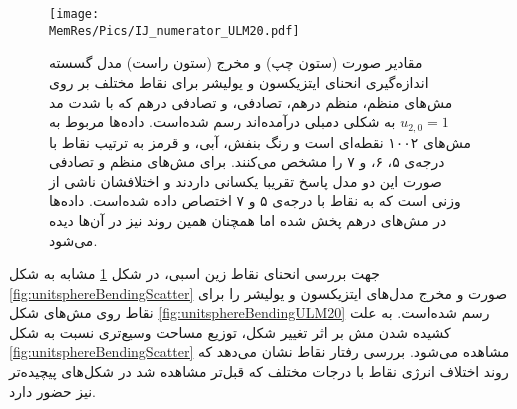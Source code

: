 \begin{figure}[htbp]
\begin{center}
\texttt{[image: \\MemRes/Pics/IJ\_numerator\_ULM20.pdf]}
\caption{
مقادیر صورت (ستون چپ) و مخرج (ستون راست) مدل گسسته اندازه‌گیری انحنای ایتزیکسون و یولیشر برای نقاط مختلف بر روی مش‌های منظم، منظم درهم، تصادفی، و تصادفی درهم که با شدت مد 
$u_{2,0}=1$
به شکلی دمبلی درآمده‌اند رسم شده‌است. داده‌ها مربوط به مش‌های ۱۰۰۲ نقطه‌ای است و  رنگ بنفش، آبی، و قرمز به ترتیب  نقاط با درجه‌ی ۵، ۶، و ۷ را مشخص می‌کنند. برای مش‌های منظم و تصادفی صورت این دو مدل پاسخ تقریبا یکسانی داردند و اختلافشان ناشی از وزنی است که به نقاط با درجه‌ی ۵ و ۷ اختصاص داده شده‌است. داده‌ها در مش‌های درهم پخش شده اما همچنان همین روند نیز در آن‌ها دیده می‌شود.
}
\label{fig:ULM20BendingScatter}
\end{center}
\end{figure}

جهت بررسی انحنای نقاط زین اسبی، در شکل 
\ref{fig:ULM20BendingScatter}
مشابه به شکل
\ref{fig:unitsphereBendingScatter}
صورت و مخرج مدل‌های ایتزیکسون و یولیشر را برای نقاط روی مش‌های شکل 
\ref{fig:unitsphereBendingULM20}
رسم شده‌است. به علت کشیده شدن مش‌ بر اثر تغییر شکل، توزیع مساحت وسیع‌تری نسبت به شکل 
\ref{fig:unitsphereBendingScatter}
مشاهده می‌شود. بررسی رفتار نقاط نشان می‌دهد که روند اختلاف انرژی نقاط با درجات مختلف که قبل‌تر مشاهده شد در شکل‌های پیچیده‌تر نیز حضور دارد.




